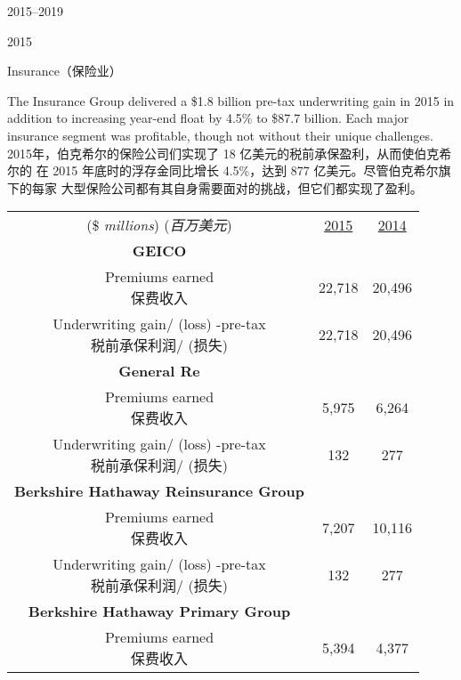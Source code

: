 \begin{chapter}{2015--2019}
\begin{section}{2015}
\begin{subsection}{Insurance（保险业）}
\begin{verseparallel}
  {
    The Insurance Group delivered a \$1.8 billion pre-tax underwriting gain in
    2015 in addition to increasing year-end float by 4.5\% to \$87.7 billion.
    Each major insurance segment was profitable, though not without their unique
    challenges. \\
  }
  {
    2015年，伯克希尔的保险公司们实现了 18 亿美元的税前承保盈利，从而使伯克希尔的
    在 2015 年底时的浮存金同比增长 4.5\%，达到 877 亿美元。尽管伯克希尔旗下的每家
    大型保险公司都有其自身需要面对的挑战，但它们都实现了盈利。
  }
\end{verseparallel}

\begin{table}[!htbp]
  \centering
  \begin{center}
    \begin{tabular}{ccc}
      \toprule
      \makecell[c]{(\$ \textit{millions}) \\ (\textit{百万美元})} & \underline{2015} & \underline{2014} \\
      \textbf{GEICO} & & \\
      \makecell[c]{Premiums earned \\ 保费收入} & 22,718 & 20,496 \\
      \makecell[c]{Underwriting gain/ (loss) -pre-tax \\ 税前承保利润/ (损失)} & 22,718 & 20,496 \\
      \textbf{General Re} & & \\
      \makecell[c]{Premiums earned \\ 保费收入} & 5,975 & 6,264 \\
      \makecell[c]{Underwriting gain/ (loss) -pre-tax \\ 税前承保利润/ (损失)} & 132 & 277 \\
      \textbf{Berkshire Hathaway Reinsurance Group} & & \\
      \makecell[c]{Premiums earned \\ 保费收入} & 7,207 & 10,116 \\
      \makecell[c]{Underwriting gain/ (loss) -pre-tax \\ 税前承保利润/ (损失)} & 132 & 277 \\
      \textbf{Berkshire Hathaway Primary Group} & & \\
      \makecell[c]{Premiums earned \\ 保费收入} & 5,394 & 4,377 \\

\end{tabular}
\end{center}
\end{table}
\end{subsection}
\end{section}
\end{chapter}
